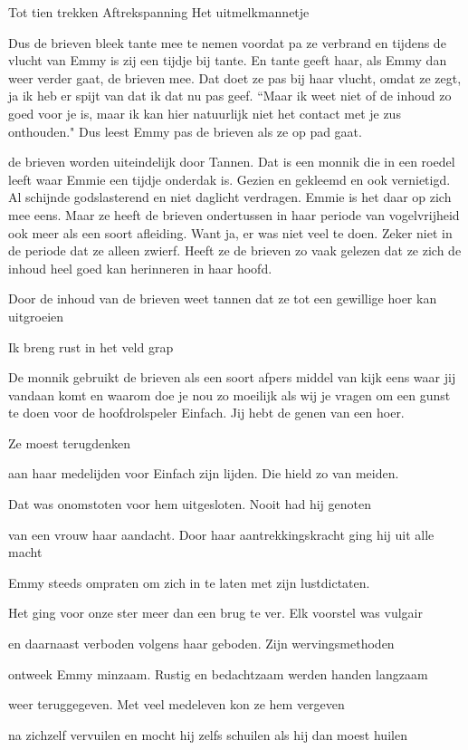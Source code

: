 Tot tien trekken
Aftrekspanning
Het uitmelkmannetje

Dus de brieven bleek  tante mee te nemen voordat pa ze verbrand en tijdens de vlucht van Emmy is zij een tijdje bij tante. En tante geeft haar, als Emmy dan weer verder gaat, de brieven mee. Dat doet ze pas bij haar vlucht, omdat ze zegt, ja ik heb er spijt van dat ik dat nu pas geef. “Maar ik weet niet of de inhoud zo goed voor je is, maar ik kan hier natuurlijk niet het contact met je zus onthouden." Dus leest Emmy pas de brieven als ze op pad gaat.

de brieven worden uiteindelijk door Tannen. Dat is een monnik die in een roedel leeft waar Emmie een tijdje onderdak is. Gezien en gekleemd en ook vernietigd. Al schijnde godslasterend en niet daglicht verdragen. Emmie is het daar op zich mee eens. Maar ze heeft de brieven ondertussen in haar periode van vogelvrijheid ook meer als een soort afleiding. Want ja, er was niet veel te doen. Zeker niet in de periode dat ze alleen zwierf. Heeft ze de brieven zo vaak gelezen dat ze zich de inhoud heel goed kan herinneren in haar hoofd.

Door de inhoud van de brieven weet tannen dat ze tot een gewillige hoer kan uitgroeien

Ik breng rust in het veld grap

De monnik gebruikt de brieven als een soort afpers middel van kijk eens waar jij vandaan komt en waarom doe je nou zo moeilijk als wij je vragen om een gunst te doen voor de hoofdrolspeler Einfach. Jij hebt de genen van een hoer.

Ze moest terugdenken

aan haar medelijden
voor Einfach zijn lijden.
Die hield zo van meiden.

Dat was onomstoten
voor hem uitgesloten.
Nooit had hij genoten

van een vrouw haar aandacht.
Door haar aantrekkingskracht
ging hij uit alle macht

Emmy steeds ompraten
om zich in te laten
met zijn lustdictaten.

Het ging voor onze ster
meer dan een brug te ver.
Elk voorstel was vulgair

en daarnaast verboden
volgens haar geboden.
Zijn wervingsmethoden

ontweek Emmy minzaam.
Rustig en bedachtzaam
werden handen langzaam

weer teruggegeven.
Met veel medeleven
kon ze hem vergeven

na zichzelf vervuilen
en mocht hij zelfs schuilen
als hij dan moest huilen

